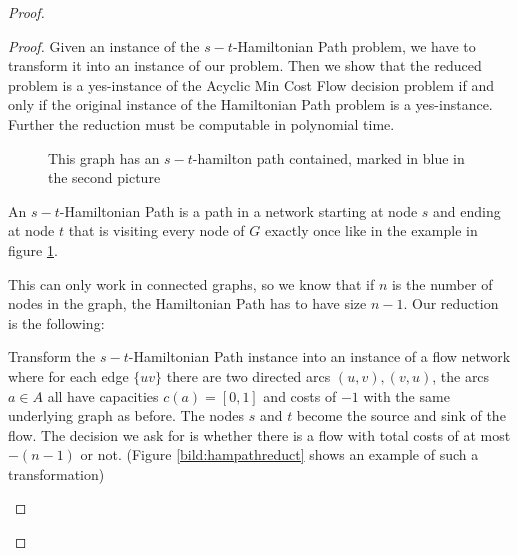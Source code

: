 \begin{proof}
\begin{proof}
Given an instance of the $s-t$-Hamiltonian Path problem, we have to transform it into an instance of our problem. Then 
we show that the reduced problem is a yes-instance of the Acyclic Min Cost Flow decision problem if and only if the 
original instance of the Hamiltonian Path problem is a yes-instance. Further the reduction must be computable in 
polynomial time.
 
\begin{figure}[h!]
\centering
{}
\caption{This graph has an $s-t$-hamilton path contained, marked in blue in the second picture}
\label{bild:hampath}
\end{figure}

An $s-t$-Hamiltonian Path is a path in a network starting at node $s$ and ending at node $t$ that is visiting every 
node of $G$ exactly once like in the example in figure \ref{bild:hampath}. 

This can only work in connected graphs, so we know that if $n$ is the number of nodes in the 
graph, the Hamiltonian Path has to have size $n-1$. Our reduction is the following:

Transform the $s-t$-Hamiltonian Path instance into an instance of a flow network where for each edge $\{uv\}$ there 
are two directed arcs $(u,v),(v,u)$, the arcs $a\in A$ all have capacities $c(a)=[0,1]$ and costs of $-1$ 
with the same underlying graph as before. The nodes $s$ and $t$ become the source and sink of the flow.
The decision we ask for is whether there is a flow with total costs of at most $-(n-1)$ or not. (Figure 
\ref{bild:hampathreduct} shows an example of such a transformation)

 
\begin{figure}[h!]
\centering
{}
\end{figure}
\end{proof}
\end{proof}
